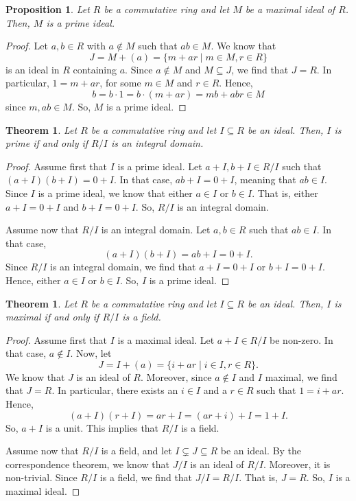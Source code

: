 \documentclass[a4paper, openany]{memoir}
\theoremstyle{definition}
\theoremstyle{plain}
\newtheorem{theorem}[definition]{Theorem}
\newtheorem{proposition}[definition]{Proposition}
\begin{document}
    \begin{proposition}
        Let $R$ be a commutative ring and let $M$ be a maximal ideal of $R$. Then, $M$ is a prime ideal.
    \end{proposition}
    \begin{proof}
        Let $a, b \in R$ with $a \not\in M$ such that $ab \in M$. We know that
        \[J = M + (a) = \{m + ar \mid m \in M, r \in R\}\]
        is an ideal in $R$ containing $a$. Since $a \not\in M$ and $M \subseteq J$, we find that $J = R$. In particular, $1 = m + ar$, for some $m \in M$ and $r \in R$. Hence,
        \[b = b \cdot 1 = b \cdot (m + ar) = mb + abr \in M\]
        since $m, ab \in M$. So, $M$ is a prime ideal.
    \end{proof}

    \begin{theorem}
        Let $R$ be a commutative ring and let $I \subseteq R$ be an ideal. Then, $I$ is prime if and only if $R/I$ is an integral domain.
    \end{theorem}
    \begin{proof}
        Assume first that $I$ is a prime ideal. Let $a + I, b + I \in R/I$ such that $(a + I) (b + I) = 0 + I$. In that case, $ab + I = 0 + I$, meaning that $ab \in I$. Since $I$ is a prime ideal, we know that either $a \in I$ or $b \in I$. That is, either $a + I = 0 + I$ and $b + I = 0 + I$. So, $R/I$ is an integral domain.

        Assume now that $R/I$ is an integral domain. Let $a, b \in R$ such that $ab \in I$. In that case,
        \[(a + I) (b + I) = ab + I = 0 + I.\]
        Since $R/I$ is an integral domain, we find that $a + I = 0 + I$ or $b + I = 0 + I$. Hence, either $a \in I$ or $b \in I$. So, $I$ is a prime ideal.
    \end{proof}

    \begin{theorem}
        Let $R$ be a commutative ring and let $I \subseteq R$ be an ideal. Then, $I$ is maximal if and only if $R/I$ is a field.
    \end{theorem}
    \begin{proof}
        Assume first that $I$ is a maximal ideal. Let $a + I \in R/I$ be non-zero. In that case, $a \not\in I$. Now, let
        \[J = I + (a) = \{i + ar \mid i \in I, r \in R\}.\]
        We know that $J$ is an ideal of $R$. Moreover, since $a \not\in I$ and $I$ maximal, we find that $J = R$. In particular, there exists an $i \in I$ and a $r \in R$ such that $1 = i + ar$. Hence,
        \[(a + I) (r + I) = ar + I = (ar + i) + I = 1 + I.\]
        So, $a + I$ is a unit. This implies that $R/I$ is a field.

        Assume now that $R/I$ is a field, and let $I \subsetneq J \subseteq R$ be an ideal. By the correspondence theorem, we know that $J/I$ is an ideal of $R/I$. Moreover, it is non-trivial. Since $R/I$ is a field, we find that $J/I = R/I$. That is, $J = R$. So, $I$ is a maximal ideal.
    \end{proof}
\end{document}
